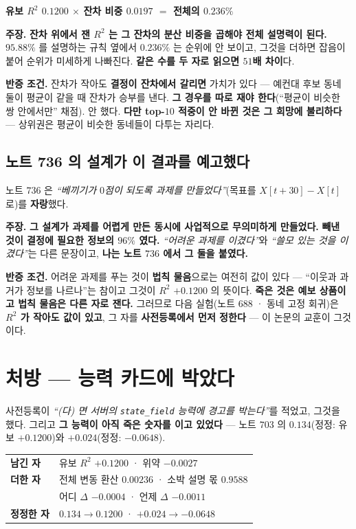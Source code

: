 \documentclass[10pt,a4paper]{article}
\newcommand{\claim}[2]{\begin{claimbox}\textbf{주장.} #1\par\smallskip
  \textcolor{gray!70}{\textbf{반증 조건.} #2}\end{claimbox}}
\begin{document}
\begin{center}
\textbf{유보 $R^2$ $0.1200$ $\times$ 잔차 비중 $0.0197$ $=$ 전체의 $\mathbf{0.236\%}$}
\end{center}

\claim{\textbf{잔차 위에서 잰 $R^2$ 는 그 잔차의 분산 비중을 곱해야 전체 설명력이
된다.} $95.88\%$ 를 설명하는 규칙 옆에서 $0.236\%$ 는 순위에 안 보이고, 그것을
더하면 잡음이 붙어 순위가 미세하게 나빠진다. \textbf{같은 수를 두 자로 읽으면 $51$배
차이}다.}
{잔차가 작아도 \textbf{결정이 잔차에서 갈리면} 가치가 있다 --- 예컨대 후보 동네 둘이
평균이 같을 때 잔차가 승부를 낸다. \textbf{그 경우를 따로 재야 한다}(``평균이 비슷한
쌍 안에서만'' 채점). 안 했다. \textbf{다만 top-$10$ 적중이 안 바뀐 것은 그 희망에
불리하다} --- 상위권은 평균이 비슷한 동네들이 다투는 자리다.}

\subsection*{노트 736 의 설계가 이 결과를 예고했다}

노트 $736$ 은 \emph{``베끼기가 $0$점이 되도록 과제를 만들었다''}(목표를
$X[t{+}30] - X[t]$ 로)를 \textbf{자랑}했다.

\claim{\textbf{그 설계가 과제를 어렵게 만든 동시에 사업적으로 무의미하게 만들었다.}
\textbf{빼낸 것이 결정에 필요한 정보의 $96\%$ 였다.} \emph{``어려운 과제를 이겼다''}와
\emph{``쓸모 있는 것을 이겼다''}는 다른 문장이고, \textbf{나는 노트 $736$ 에서 그 둘을
붙였다.}}
{어려운 과제를 푸는 것이 \textbf{법칙 물음}으로는 여전히 값이 있다 --- ``이웃과 과거가
정보를 나르나''는 참이고 그것이 $R^2$ $+0.1200$ 의 뜻이다. \textbf{죽은 것은 예보
상품이고 법칙 물음은 다른 자로 잰다.} 그러므로 다음 실험(노트 $688$ · 동네 고정
회귀)은 \textbf{$R^2$ 가 작아도 값이 있고}, 그 자를 \textbf{사전등록에서 먼저
정한다} --- 이 논문의 교훈이 그것이다.}

\section{처방 --- 능력 카드에 박았다}

사전등록이 \emph{``(다) 면 서버의 \texttt{state\_field} 능력에 경고를 박는다''}를
적었고, 그것을 했다. 그리고 \textbf{그 능력이 아직 죽은 숫자를 이고 있었다} ---
노트 $703$ 의 $0.134$(정정: 유보 $+0.1200$)와 $+0.024$(정정: $-0.0648$).

\begin{center}
\begin{tabular}{ll}
\toprule
\textbf{남긴 자} & 유보 $R^2$ $+0.1200$ · 위약 $-0.0027$ \\
\textbf{더한 자} & 전체 변동 환산 $\mathbf{0.00236}$ · 소박 설명 몫 $\mathbf{0.9588}$ \\
& 어디 $\Delta$ $-0.0004$ · 언제 $\Delta$ $-0.0011$ \\
\textbf{정정한 자} & $0.134 \to 0.1200$ · $+0.024 \to -0.0648$ \\
\bottomrule
\end{tabular}
\end{center}
\end{document}
